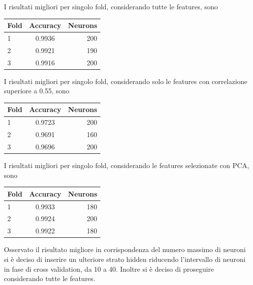 \documentclass[12pt]{report}
\begin{document}
I risultati migliori per singolo fold, considerando tutte le features, sono
\begin{center}
\begin{tabular}{lcr}
\toprule
Fold & Accuracy & Neurons \\
\midrule
1  & 0.9936 & 200\\
2  & 0.9921 & 190\\
3  & 0.9916 & 200\\
\bottomrule
\end{tabular}
\end{center}

\par\null\par
\par\null\par

I risultati migliori per singolo fold, considerando solo le features con correlazione superiore a 0.55, sono

\begin{center}
\begin{tabular}{lcr}
\toprule
Fold & Accuracy & Neurons \\
\midrule
1  & 0.9723 & 200\\
2  & 0.9691 & 160\\
3  & 0.9696 & 200\\
\bottomrule
\end{tabular}
\end{center}

\par\null\par
\par\null\par

I risultati migliori per singolo fold, considerando le features selezionate con PCA, sono

\begin{center}
\begin{tabular}{lcr}
\toprule
Fold & Accuracy & Neurons \\
\midrule
1  & 0.9933 & 180\\
2  & 0.9924 & 200\\
3  & 0.9922 & 180\\
\bottomrule
\end{tabular}
\end{center}

\par\null\par

Osservato il risultato migliore in corrispondenza del numero massimo di neuroni si è deciso di inserire un ulteriore strato hidden riducendo l'intervallo di neuroni in fase di cross validation, da 10 a 40.
Inoltre si è deciso di proseguire considerando tutte le features.
\end{document}
